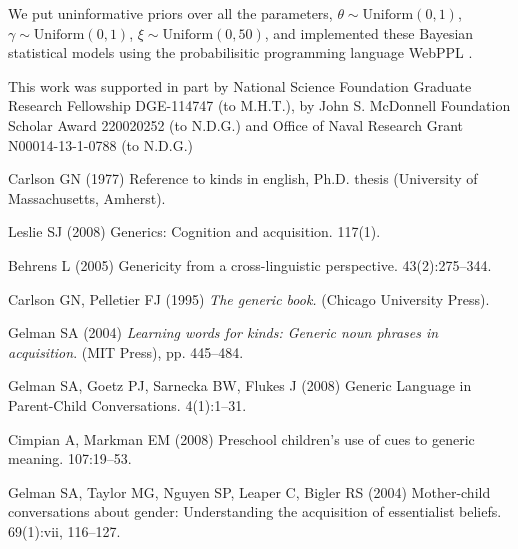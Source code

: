 \documentclass{pnastwo}
\begin{document}
\begin{article}
\begin{materials}
We put uninformative priors over all the parameters, {\small $\theta \sim \text{Uniform}(0,1)$, 
$\gamma \sim \text{Uniform}(0,1)$, $\xi \sim \text{Uniform}(0, 50)$}, and implemented these Bayesian statistical models using the probabilisitic programming language WebPPL \cite{dippl}. 
\end{materials}
%
\begin{acknowledgments}
This work was supported in part by National Science Foundation Graduate Research Fellowship DGE-114747 (to M.H.T.),
by John S. McDonnell Foundation Scholar Award 220020252 (to N.D.G.) and 
Office of Naval Research Grant N00014-13-1-0788 (to N.D.G.)
\end{acknowledgments}
%
\begin{thebibliography}{10}

Carlson GN (1977) Reference to kinds in english, Ph.D. thesis (University of Massachusetts, Amherst).

Leslie SJ (2008) {Generics: Cognition and acquisition}.
 117(1).

Behrens L (2005) {Genericity from a cross-linguistic perspective}.
 43(2):275--344.

Carlson GN, Pelletier FJ (1995) {\em The generic book.}
\newblock (Chicago University Press).

Gelman SA (2004) {\em Learning words for kinds: Generic noun phrases in
  acquisition}.
\newblock (MIT Press), pp. 445--484.

Gelman SA, Goetz PJ, Sarnecka BW, Flukes J (2008) {Generic Language in
  Parent-Child Conversations}.
 4(1):1--31.

Cimpian A, Markman EM (2008) {Preschool children's use of cues to generic
  meaning}.
 107:19--53.

Gelman SA, Taylor MG, Nguyen SP, Leaper C, Bigler RS (2004) {Mother-child
  conversations about gender: Understanding the acquisition of essentialist
  beliefs}.
  69(1):vii, 116--127.


\end{thebibliography}
\end{article}
\end{document}
